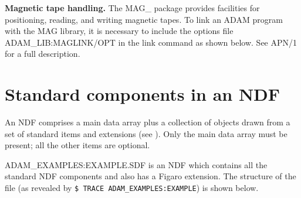 \documentclass[twoside,11pt,nolof]{starlink}
\begin{document}
\begin{description}
\item\textbf{Magnetic tape handling.}
The MAG\_ package provides facilities for positioning, reading, and writing
magnetic tapes.
To link an ADAM program with the MAG  library, it is necessary to
include the options file
ADAM\_LIB:MAGLINK/OPT in the link command as shown below.
See APN/1 for a full
description.

\end{description}
\newpage

\appendix
\section{Standard components in an NDF\label{apxndf}}

An NDF comprises a main data array plus a collection of objects drawn from
a set of standard items and extensions (see ).
Only the main data array must be present; all the other items are optional.

ADAM\_EXAMPLES:EXAMPLE.SDF is an NDF which contains all the standard
NDF components and also has a Figaro extension.
The structure of the file
(as revealed by \texttt{\$ TRACE ADAM\_EXAMPLES:EXAMPLE}) is shown below.
\end{document}
